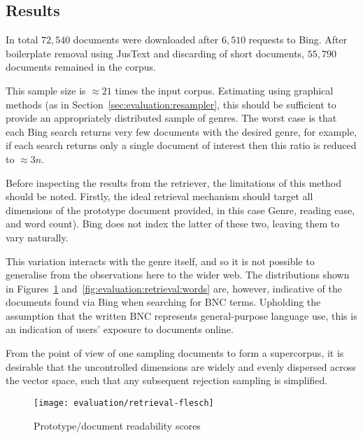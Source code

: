 \subsection{Results}
\label{sec:evaluation:results}

In total $72,540$ documents were downloaded after $6,510$ requests to Bing.  After boilerplate removal using JusText\cite{pomikalek2013justext} and discarding of short documents, $55,790$ documents remained in the corpus.


This sample size is $\approx 21$ times the input corpus.  Estimating using graphical methods (as in Section~\ref{sec:evaluation:resampler}, this should be sufficient to provide an appropriately distributed sample of genres.  The worst case is that each Bing search returns very few documents with the desired genre, for example, if each search returns only a single document of interest then this ratio is reduced to $\approx 3n$.



Before inspecting the results from the retriever, the limitations of this method should be noted.  Firstly, the ideal retrieval mechanism should target all dimensions of the prototype document provided, in this case Genre, reading ease, and word count).  Bing does not index the latter of these two, leaving them to vary naturally.

This variation interacts with the genre itself, and so it is not possible to generalise from the observations here to the wider web.  The distributions shown in Figures~\ref{fig:evaluation:retrieval:flesh} and~\ref{fig:evaluation:retrieval:words} are, however, indicative of the documents found via Bing when searching for BNC terms.  Upholding the assumption that the written BNC represents general-purpose language use, this is an indication of users' exposure to documents online.%

From the point of view of one sampling documents to form a supercorpus, it is desirable that the uncontrolled dimensions are widely and evenly dispersed across the vector space, such that any subsequent rejection sampling is simplified.


\begin{figure}[Ht]
    \centering
    \texttt{[image: evaluation/retrieval-flesch]}
    \caption{Prototype/document readability scores}
    \label{fig:evaluation:retrieval:flesh}
\end{figure}


